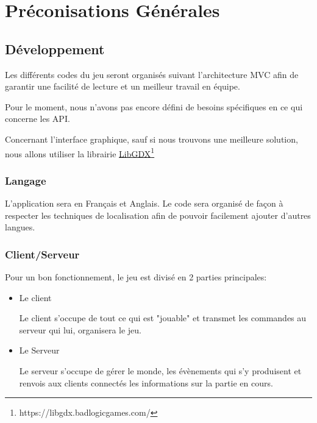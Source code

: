 \chapter{Préconisations Générales}
\label{sec:preconisationsGenerales}

\section{Développement}
Les différents codes du jeu seront organisés suivant l'architecture MVC afin de garantir une facilité de lecture et un meilleur travail en équipe.

Pour le moment, nous n'avons pas encore défini de besoins spécifiques en ce qui concerne les API.

Concernant l'interface graphique, sauf si nous trouvons une meilleure solution, nous allons utiliser la librairie \href{https://libgdx.badlogicgames.com/}{LibGDX\footnote{https://libgdx.badlogicgames.com/}}

\subsection{Langage}
L'application sera en Français et Anglais. Le code sera organisé de façon à respecter les techniques de localisation afin de pouvoir facilement ajouter d'autres langues.

\subsection{Client/Serveur}
Pour un bon fonctionnement, le jeu est divisé en 2 parties principales:
\begin{itemize}
    \item Le client
    
    Le client s'occupe de tout ce qui est "jouable" et transmet les commandes au serveur qui lui, organisera le jeu.
    \item Le Serveur 
    
    Le serveur s'occupe de gérer le monde, les évènements qui s'y produisent et renvois aux clients connectés les informations sur la partie en cours.
\end{itemize}



